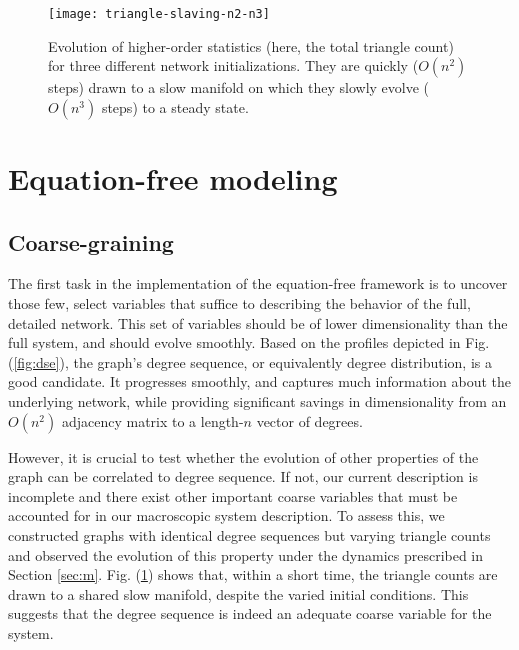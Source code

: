 \documentclass[epjST, final]{svjour}
\begin{document}
\begin{onehalfspace}
\begin{figure}[th!]
    \centering
    \texttt{[image: triangle-slaving-n2-n3]}
  \caption{Evolution of higher-order statistics (here, the total
    triangle count) for three different network initializations. They
    are quickly ($O(n^2)$ steps) drawn to a slow manifold on which
    they slowly evolve ($O(n^3)$ steps) to a steady
    state. \label{fig:sv}}
\end{figure}


\section{Equation-free modeling}
\label{sec:ef}

\subsection{Coarse-graining}

The first task in the implementation of the equation-free framework is to uncover those few, select variables that suffice to describing the behavior of the full, detailed network. This set of variables should be of lower dimensionality than the full system, and should evolve smoothly. Based on the profiles depicted in Fig. (\ref{fig:dse}), the graph's degree sequence, or equivalently degree distribution, is a good candidate. It progresses smoothly, and captures much information about the underlying network, while providing significant savings in dimensionality from an $O(n^2)$ adjacency matrix to a length-$n$ vector of degrees. \par

However, it is crucial to test whether the evolution of other
properties of the graph can be correlated to degree sequence. If not,
our current description is incomplete and there exist other important
coarse variables that must be accounted for in our macroscopic system
description. To assess this, we constructed graphs with identical
degree sequences but varying triangle counts and observed the
evolution of this property under the dynamics prescribed in Section
\ref{sec:m}. Fig. (\ref{fig:sv}) shows that, within a short time, the
triangle counts are drawn to a shared slow manifold, despite the varied
initial conditions. This suggests that the degree sequence is indeed
an adequate coarse variable for the system. \par


\end{onehalfspace}
\end{document}

